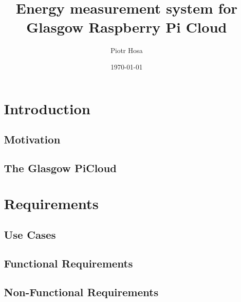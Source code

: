 \documentclass{l4proj}
\begin{document}
\title{Energy measurement system for Glasgow Raspberry Pi Cloud}
\author{Piotr Hosa}
\date{\today}
\maketitle

\begin{abstract}

\end{abstract}

\renewcommand{\abstractname}{Acknowledgements}
\begin{abstract}

\end{abstract}



\educationalconsent
%
%
\tableofcontents

\chapter{Introduction}

\section{Motivation}

\section{The Glasgow PiCloud}

\chapter{Requirements}

\section{Use Cases}
\section{Functional Requirements}
\section{Non-Functional Requirements}
\end{document}
